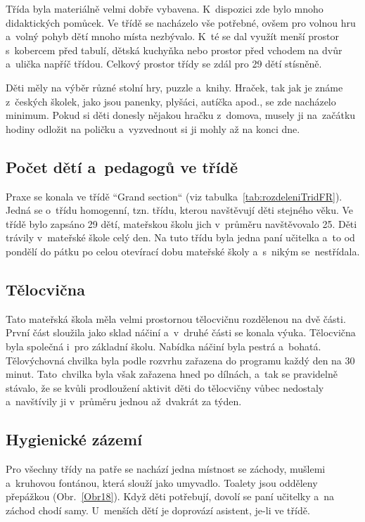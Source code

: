			Třída byla materiálně velmi dobře vybavena. K~dispozici zde bylo mnoho didaktických pomůcek. Ve třídě se nacházelo vše potřebné, ovšem pro volnou hru a~volný pohyb dětí mnoho místa nezbývalo. K~té se dal využít menší prostor s kobercem před tabulí, dětská kuchyňka nebo prostor před vchodem na dvůr a~ulička napříč třídou. Celkový prostor třídy se zdál pro 29 dětí stísněně.

			Děti měly na výběr různé stolní hry, puzzle a~knihy. Hraček, tak jak je známe z~českých školek, jako jsou panenky, plyšáci, autíčka apod., se zde nacházelo minimum. Pokud si děti donesly nějakou hračku z~domova, musely ji na začátku hodiny odložit na poličku a~vyzvednout si ji mohly až na konci dne. 

		\subsection{Počet dětí a~pedagogů ve třídě}
		\label{trida}

			Praxe se konala ve třídě “Grand section“ (viz tabulka~\ref{tab:rozdeleniTridFR}). Jedná se o~třídu homogenní, tzn. třídu, kterou navštěvují děti stejného věku. Ve třídě bylo zapsáno 29 dětí, mateřskou školu jich v průměru navštěvovalo 25. Děti trávily v mateřské škole celý den. Na tuto třídu byla jedna paní učitelka a~to od pondělí do pátku po celou otevírací dobu mateřské školy a~s nikým se nestřídala. 

		\subsection{Tělocvična}
			Tato mateřská škola měla velmi prostornou tělocvičnu rozdělenou na dvě části. První část sloužila jako sklad náčiní a~v~druhé části se konala výuka. Tělocvična byla společná i~pro základní školu. Nabídka náčiní byla pestrá a~bohatá. Tělovýchovná chvilka byla podle rozvrhu zařazena do programu každý den na 30 minut. Tato chvilka byla však zařazena hned po dílnách, a~tak se pravidelně stávalo, že se kvůli prodloužení aktivit děti do tělocvičny vůbec nedostaly a~navštívily ji v~průměru jednou až dvakrát za týden. 

		\subsection{Hygienické zázemí}
		\label{zachody}
			Pro všechny třídy na patře se nachází jedna místnost se záchody, mušlemi a~kruhovou fontánou, která slouží jako umyvadlo. Toalety jsou odděleny přepážkou (Obr.~\ref{Obr18}). Když děti potřebují, dovolí se paní učitelky a~na záchod chodí samy. U~menších dětí je doprovází asistent, je-li ve třídě. 
	

